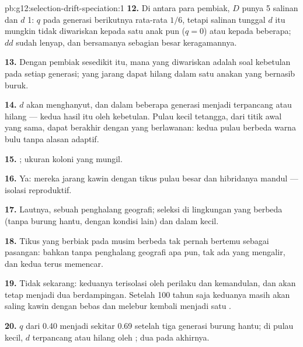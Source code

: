 \begin{solution}{pb:g12:selection-drift-speciation:1}
\textbf{12.} Di antara para pembiak, $D$ punya 5 salinan dan $d$ 1: $q$ pada
generasi berikutnya rata-rata $1/6$, tetapi salinan tunggal $d$ itu
mungkin tidak diwariskan kepada satu anak pun ($q = 0$) atau kepada
beberapa;  $dd$ sudah lenyap, dan bersamanya sebagian besar
keragamannya.

\textbf{13.} Dengan pembiak sesedikit itu,  mana yang diwariskan
adalah soal kebetulan pada setiap generasi;  yang jarang dapat
hilang dalam satu anakan yang bernasib buruk.

\textbf{14.} $d$ akan menghanyut, dan dalam beberapa generasi menjadi
terpancang atau hilang --- kedua hasil itu oleh kebetulan. Pulau kecil
tetangga, dari titik awal yang sama, dapat berakhir dengan  yang
berlawanan: kedua pulau berbeda warna bulu tanpa alasan adaptif.

\textbf{15.} ; ukuran koloni yang mungil.

\textbf{16.} Ya: mereka jarang kawin dengan tikus pulau besar dan
hibridanya mandul --- isolasi reproduktif.

\textbf{17.} Lautnya, sebuah penghalang geografi; seleksi di
lingkungan yang berbeda (tanpa burung hantu, dengan kondisi lain) dan
 dalam  kecil.

\textbf{18.} Tikus yang berbiak pada musim berbeda tak pernah bertemu
sebagai pasangan: bahkan tanpa penghalang geografi apa pun, tak ada
 yang mengalir, dan kedua  terus memencar.

\textbf{19.} Tidak sekarang: keduanya terisolasi oleh perilaku dan
kemandulan, dan akan tetap menjadi dua  berdampingan. Setelah
100 tahun saja keduanya masih akan saling kawin dengan bebas dan
melebur kembali menjadi satu .

\textbf{20.} $q$ dari 0.40 menjadi sekitar 0.69 setelah tiga generasi
burung hantu; di pulau kecil, $d$ terpancang atau hilang oleh ; dua  pada akhirnya.
\end{solution}
